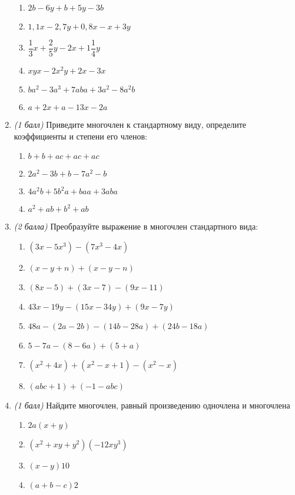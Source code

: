 \documentclass[12pt, a4paper]{article}
\begin{document}
\begin{enumerate}
\begin{multicols}{2}
\begin{enumerate}[label=\asbuk*)]
				\item $2b-6y+b+5y-3b$
				\item $1,1x-2,7y+0,8x-x+3y$
				\item $\dfrac{1}{3}x+\dfrac{2}{5}y-2x+1\dfrac{1}{4}y$
				\item $xyx-2x^2y+2x-3x$
				\item $ba^2-3a^3+7aba+3a^2-8a^2b$
				\item $a+2x+a-13x-2a$
			\end{enumerate}
		\end{multicols}
		\item \textit{(1 балл)} Приведите многочлен к стандартному виду, определите коэффициенты и степени его членов:
		\begin{multicols}{2}
			\begin{enumerate}[label=\asbuk*)]
				\item $b+b+ac+ac+ac$
				\item $2a^2-3b+b-7a^2-b$
				\item $4a^2b+5b^2a+baa+3aba$
				\item $a^2+ab+b^2+ab$
			\end{enumerate}
		\end{multicols}
		\item \textit{(2 балла)} Преобразуйте выражение в многочлен стандартного вида:
		\begin{multicols}{2}
			\begin{enumerate}[label=\asbuk*)]
				\item $(3x-5x^3)-(7x^3-4x)$
				\item $(x-y+n)+(x-y-n)$
				\item $(8x-5)+(3x-7)-(9x-11)$
				\item $43x-19y-(15x-34y)+(9x-7y)$
				\item $48a-(2a-2b)-(14b-28a)+(24b-18a)$
				\item $5-7a-(8-6a)+(5+a)$
				\item $(x^2+4x)+(x^2-x+1)-(x^2-x)$
				\item $(abc+1)+(-1-abc)$
			\end{enumerate}
		\end{multicols}
		\item \textit{(1 балл)} Найдите многочлен, равный произведению одночлена и многочлена
		\begin{multicols}{2}
			\begin{enumerate}[label=\asbuk*)]
				\item $2a(x+y)$
				\item $(x^2+xy+y^2)(-12xy^3)$
				\item $(x-y)10$
				\item $(a+b-c)2$
			\end{enumerate}
		\end{multicols}
	\end{enumerate}
\end{document}
